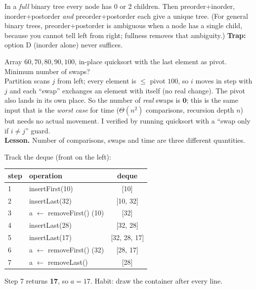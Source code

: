 \documentclass[11pt,a4paper]{article}
\begin{document}
\begin{example}
In a \emph{full} binary tree every node has 0 or 2 children. Then preorder+inorder, inorder+postorder \emph{and} preorder+postorder each give a unique tree. (For general binary trees, preorder+postorder is ambiguous when a node has a single child, because you cannot tell left from right; fullness removes that ambiguity.) \textbf{Trap:} option D (inorder alone) never suffices.
\end{example}

\begin{example}
Array $60,70,80,90,100$, in-place quicksort with the last element as pivot. Minimum number of swaps?\\
Partition scans $j$ from left; every element is $\le$ pivot $100$, so $i$ moves in step with $j$ and each ``swap'' exchanges an element with itself (no real change). The pivot also lands in its own place. So the number of \emph{real} swaps is $\mathbf{0}$; this is the same input that is the \emph{worst case} for time ($\Theta(n^2)$ comparisons, recursion depth $n$) but needs no actual movement. I verified by running quicksort with a ``swap only if $i\ne j$'' guard.\\
\textbf{Lesson.} Number of comparisons, swaps and time are three different quantities.
\end{example}

\begin{example}
Track the deque (front on the left):
\begin{center}
\begin{tabular}{llc}\toprule
step & operation & deque\\\midrule
1 & insertFirst(10) & [10]\\
2 & insertLast(32) & [10, 32]\\
3 & a $\gets$ removeFirst() (10) & [32]\\
4 & insertLast(28) & [32, 28]\\
5 & insertLast(17) & [32, 28, 17]\\
6 & a $\gets$ removeFirst() (32) & [28, 17]\\
7 & a $\gets$ removeLast() & [28]\\\bottomrule
\end{tabular}
\end{center}
Step 7 returns \textbf{17}, so $a=17$. Habit: draw the container after every line.
\end{example}
\end{document}
